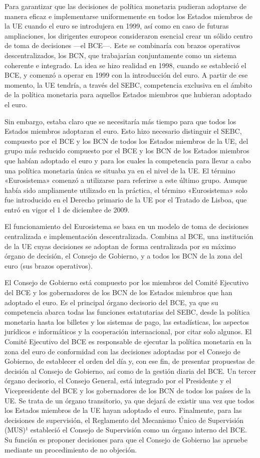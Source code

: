 \documentclass[10pt,a4paper]{article}
\begin{document}
{Para garantizar que las decisiones de política monetaria pudieran adoptarse de manera eficaz e implementarse uniformemente en todos los Estados miembros de la UE cuando el euro se introdujera en 1999, así como en caso de futuras ampliaciones, los dirigentes europeos consideraron esencial crear un sólido centro de toma de decisiones —el BCE—. Este se combinaría con brazos operativos descentralizados, los BCN, que trabajarían conjuntamente como un sistema coherente e integrado. La idea se hizo realidad en 1998, cuando se estableció el BCE, y comenzó a operar en 1999 con la introducción del euro. A partir de ese momento, la UE tendría, a través del SEBC, competencia exclusiva en el ámbito de la política monetaria para aquellos Estados miembros que hubieran adoptado el euro.

Sin embargo, estaba claro que se necesitaría más tiempo para que todos los Estados miembros adoptaran el euro. Esto hizo necesario distinguir el SEBC, compuesto por el BCE y los BCN de todos los Estados miembros de la UE, del grupo más reducido compuesto por el BCE y los BCN de los Estados miembros que habían adoptado el euro y para los cuales la competencia para llevar a cabo una política monetaria única se situaba ya en el nivel de la UE. El término «Eurosistema» comenzó a utilizarse para referirse a este último grupo. Aunque había sido ampliamente utilizado en la práctica, el término «Eurosistema» solo fue introducido en el Derecho primario de la UE por el Tratado de Lisboa, que entró en vigor el 1 de diciembre de 2009.

El funcionamiento del Eurosistema se basa en un modelo de toma de decisiones centralizada e implementación descentralizada. Combina al BCE, una institución de la UE cuyas decisiones se adoptan de forma centralizada por su máximo órgano de decisión, el Consejo de Gobierno, y a todos los BCN de la zona del euro (sus brazos operativos).

El Consejo de Gobierno está compuesto por los miembros del Comité Ejecutivo del BCE y los gobernadores de los BCN de los Estados miembros que han adoptado el euro. Es el principal órgano decisorio del BCE, ya que su competencia abarca todas las funciones estatutarias del SEBC, desde la política monetaria hasta los billetes y los sistemas de pago, las estadísticas, los aspectos jurídicos e informáticos y la cooperación internacional, por citar solo algunos. El Comité Ejecutivo del BCE es responsable de ejecutar la política monetaria en la zona del euro de conformidad con las decisiones adoptadas por el Consejo de Gobierno, de establecer el orden del día y, con ese fin, de presentar propuestas de decisión al Consejo de Gobierno, así como de la gestión diaria del BCE. Un tercer órgano decisorio, el Consejo General, está integrado por el Presidente y el Vicepresidente del BCE y los gobernadores de los BCN de todos los países de la UE. Se trata de un órgano transitorio, ya que dejará de existir una vez que todos los Estados miembros de la UE hayan adoptado el euro. Finalmente, para las decisiones de supervisión, el Reglamento del Mecanismo Único de Supervisión (MUS)¹ estableció el Consejo de Supervisión como un órgano interno del BCE. Su función es proponer decisiones para que el Consejo de Gobierno las apruebe mediante un procedimiento de no objeción.

}
\end{document}
